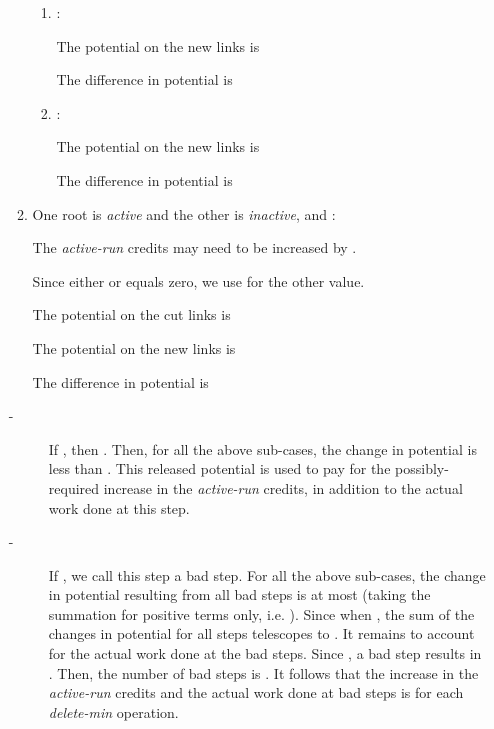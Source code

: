 \begin{enumerate}
\begin{enumerate}
\begin{enumerate}
 
\item :

The potential on the new links is 
 
The difference in potential is
 
 
\item :

The potential on the new links is
 
The difference in potential is
 

\end{enumerate}



\item One root is {\it active} and the other is {\it inactive}, and :

The {\it active-run} credits may need to be increased by . 

Since either  or  equals zero, we use  for the other value.

 
The potential on the cut links is


The potential on the new links is
 

The difference in potential is
 

\end{enumerate}

\vspace{.1in}

\begin{description}

\item[-] If , then . Then, for all the above sub-cases, the change in potential is less than . This released potential is used to pay for the possibly-required increase in the {\it active-run} credits, in addition to the actual work done at this step. 

\item[-] If , we call this step a bad step. For all the above sub-cases, the change in potential resulting from all bad steps is at most  (taking the summation for positive terms only, i.e. ). Since  when , the sum of the changes in potential for all steps telescopes to . It remains to account for the actual work done at the bad steps. Since , a bad step results in .  Then, the number of bad steps is . It follows that the increase in the {\it active-run} credits and the actual work done at bad steps is  for each {\it delete-min} operation.\\  

\end{description}



\end{enumerate}
